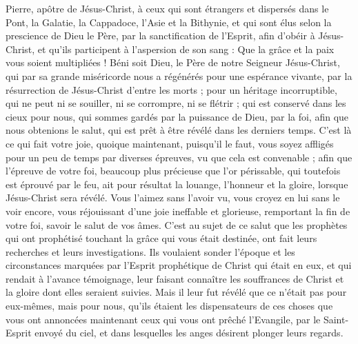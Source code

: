 \begin{multicols}{2}
\VerseOne{}Pierre, apôtre de Jésus-Christ, à ceux qui sont étrangers et dispersés dans le Pont, la Galatie, la Cappadoce, l’Asie et la Bithynie,
et qui sont élus selon la prescience de Dieu le Père, par la sanctification de l’Esprit, afin d’obéir à Jésus-Christ, et qu’ils participent à l'aspersion de son sang : Que la grâce et la paix vous soient multipliées !
Béni soit Dieu, le Père de notre Seigneur Jésus-Christ, qui par sa grande miséricorde nous a régénérés pour une espérance vivante, par la résurrection de Jésus-Christ d'entre les morts ;
pour un héritage incorruptible, qui ne peut ni se souiller, ni se corrompre, ni se flétrir ; qui est conservé dans les cieux pour nous,
qui sommes gardés par la puissance de Dieu, par la foi, afin que nous obtenions le salut, qui est prêt à être révélé dans les derniers temps.
C’est là ce qui fait votre joie, quoique maintenant, puisqu’il le faut, vous soyez affligés pour un peu de temps par diverses épreuves, vu que cela est convenable ;
afin que l'épreuve de votre foi, beaucoup plus précieuse que l'or périssable, qui toutefois est éprouvé par le feu, ait pour résultat la louange, l’honneur et la gloire, lorsque Jésus-Christ sera révélé.
Vous l’aimez sans l’avoir vu, vous croyez en lui sans le voir encore, vous réjouissant d’une joie ineffable et glorieuse,
remportant la fin de votre foi, savoir le salut de vos âmes.
C’est au sujet de ce salut que les prophètes qui ont prophétisé touchant la grâce qui vous était destinée, ont fait leurs recherches et leurs investigations.
Ils voulaient sonder l’époque et les circonstances marquées par l'Esprit prophétique de Christ qui était en eux, et qui rendait à l’avance témoignage, leur faisant connaître les souffrances de Christ et la gloire dont elles seraient suivies.
Mais il leur fut révélé que ce n'était pas pour eux-mêmes, mais pour nous, qu'ils étaient les dispensateurs de ces choses que vous ont annoncées maintenant ceux qui vous ont prêché l'Evangile, par le Saint-Esprit envoyé du ciel, et dans lesquelles les anges désirent plonger leurs regards.

\end{multicols}
